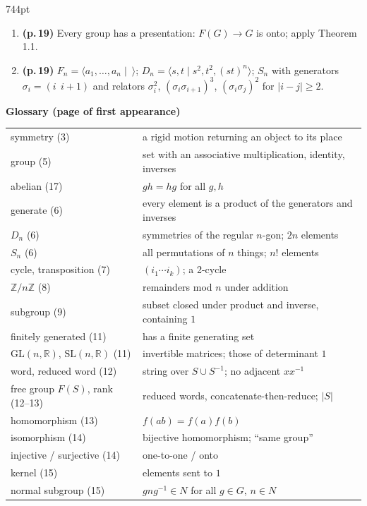 \documentclass[10pt]{article}
\newcommand{\Z}{\mathbb{Z}}
\newcommand{\R}{\mathbb{R}}
\newcommand{\GL}{\mathrm{GL}}
\newcommand{\SL}{\mathrm{SL}}
\newcommand{\inv}{^{-1}}
\begin{document}
\begin{textblock*}{744pt}
\begin{minipage}[t]{370pt}
\begin{enumerate}[leftmargin=*,itemsep=2pt]
\item \textbf{(p.\,19)} Every group has a presentation: $F(G)\to G$ is onto; apply Theorem 1.1.
\item \textbf{(p.\,19)} $F_n=\langle a_1,\dots,a_n\mid\ \rangle$; $D_n=\langle s,t\mid s^2,t^2,(st)^n\rangle$; $S_n$ with generators $\sigma_i=(i\;\,i{+}1)$ and relators $\sigma_i^2$, $(\sigma_i\sigma_{i+1})^3$, $(\sigma_i\sigma_j)^2$ for $|i-j|\ge2$.
\end{enumerate}
\end{minipage}\hfill
\begin{minipage}[t]{345pt}
\small
{\sffamily\bfseries Glossary (page of first appearance)}\par\vspace{3pt}
\begin{tabular}{@{}p{95pt}p{245pt}@{}}
symmetry (3) & a rigid motion returning an object to its place\\
group (5) & set with an associative multiplication, identity, inverses\\
abelian (17) & $gh=hg$ for all $g,h$\\
generate (6) & every element is a product of the generators and inverses\\
$D_n$ (6) & symmetries of the regular $n$-gon; $2n$ elements\\
$S_n$ (6) & all permutations of $n$ things; $n!$ elements\\
cycle, transposition (7) & $(i_1\cdots i_k)$; a 2-cycle\\
$\Z/n\Z$ (8) & remainders mod $n$ under addition\\
subgroup (9) & subset closed under product and inverse, containing $1$\\
finitely generated (11) & has a finite generating set\\
$\GL(n,\R)$, $\SL(n,\R)$ (11) & invertible matrices; those of determinant $1$\\
word, reduced word (12) & string over $S\cup S\inv$; no adjacent $xx\inv$\\
free group $F(S)$, rank (12--13) & reduced words, concatenate-then-reduce; $|S|$\\
homomorphism (13) & $f(ab)=f(a)f(b)$\\
isomorphism (14) & bijective homomorphism; ``same group''\\
injective / surjective (14) & one-to-one / onto\\
kernel (15) & elements sent to $1$\\
normal subgroup (15) & $gng\inv\in N$ for all $g\in G$, $n\in N$\\

\end{tabular}
\end{minipage}
\end{textblock*}
\end{document}
